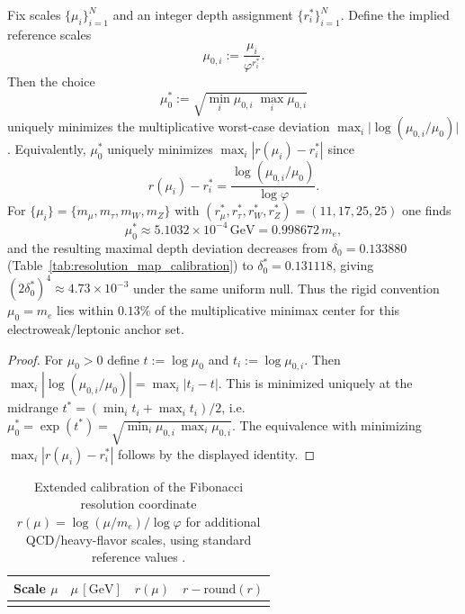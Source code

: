 \begin{proposition}\label{prop:resolution_mu0_minimax}
Fix scales $\{\mu_i\}_{i=1}^N$ and an integer depth assignment $\{r_i^*\}_{i=1}^N$. Define the implied reference scales
\begin{equation}
\mu_{0,i}:=\frac{\mu_i}{\varphi^{r_i^*}}.
\end{equation}
Then the choice
\begin{equation}
\mu_0^*:=\sqrt{\min_i \mu_{0,i}\;\max_i \mu_{0,i}}
\end{equation}
uniquely minimizes the multiplicative worst-case deviation $\max_i\big|\log(\mu_{0,i}/\mu_0)\big|$. Equivalently, $\mu_0^*$ uniquely minimizes $\max_i |r(\mu_i)-r_i^*|$ since
\begin{equation}
r(\mu_i)-r_i^*=\frac{\log(\mu_{0,i}/\mu_0)}{\log\varphi}.
\end{equation}
For $\{\mu_i\}=\{m_\mu,m_\tau,m_W,m_Z\}$ with $(r_\mu^*,r_\tau^*,r_W^*,r_Z^*)=(11,17,25,25)$ one finds
\begin{equation}
\mu_0^*\approx 5.1032\times 10^{-4}\,\mathrm{GeV}=0.998672\,m_e,
\end{equation}
and the resulting maximal depth deviation decreases from $\delta_0=0.133880$ (Table~\ref{tab:resolution_map_calibration}) to $\delta_0^*=0.131118$, giving $(2\delta_0^*)^4\approx 4.73\times 10^{-3}$ under the same uniform null. Thus the rigid convention $\mu_0=m_e$ lies within $0.13\%$ of the multiplicative minimax center for this electroweak/leptonic anchor set.
\end{proposition}
\begin{proof}
For $\mu_0>0$ define $t:=\log\mu_0$ and $t_i:=\log\mu_{0,i}$. Then $\max_i|\log(\mu_{0,i}/\mu_0)|=\max_i|t_i-t|$. This is minimized uniquely at the midrange $t^*=(\min_i t_i+\max_i t_i)/2$, i.e.\ $\mu_0^*=\exp(t^*)=\sqrt{\min_i\mu_{0,i}\,\max_i\mu_{0,i}}$. The equivalence with minimizing $\max_i|r(\mu_i)-r_i^*|$ follows by the displayed identity.
\end{proof}

\begin{table}[t]
\centering
\begin{tabular}{@{}lrrr@{}}
\toprule
Scale $\mu$ & $\mu\,[\mathrm{GeV}]$ & $r(\mu)$ & $r-\mathrm{round}(r)$ \\
\midrule
%
\\
\bottomrule
\end{tabular}
\caption{Extended calibration of the Fibonacci resolution coordinate $r(\mu)=\log(\mu/m_e)/\log\varphi$ for additional QCD/heavy-flavor scales, using standard reference values \cite{PDGRPP2024}.}
\label{tab:resolution_map_calibration_extended}
\end{table}

